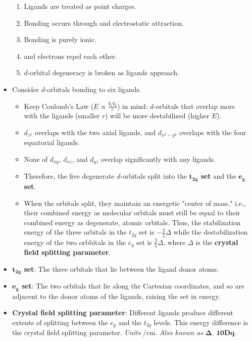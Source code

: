 \documentclass[../notes.tex]{subfiles}
\begin{document}
\begin{itemize}
\begin{enumerate}
        \item Ligands are treated as point charges.
        \item Bonding occurs through  and  electrostatic attraction.
        \item Bonding is purely ionic.
        \item {} and  electrons repel each other.
        \item $d$-orbital degeneracy is broken as ligands approach.
    \end{enumerate}
    \item Consider $d$-orbitals bonding to six ligands.
    \begin{itemize}
        \item Keep Coulomb's Law ($E\propto\frac{q_1q_2}{r}$) in mind: $d$-orbitals that overlap more with the ligands (smaller $r$) will be more destabilized (higher $E$).
        \item $d_{z^2}$ overlaps with the two axial ligands, and $d_{x^2-y^2}$ overlaps with the four equatorial ligands.
        \item None of $d_{xy}$, $d_{xz}$, and $d_{yz}$ overlap significantly with any ligands.
        \item Therefore, the five degenerate $d$-orbitals split into the \textbf{$\bm{t_{2g}}$ set} and the \textbf{$\bm{e_g}$ set}.
        \item When the orbitals split, they maintain an energetic "center of mass," i.e., their combined energy as molecular orbitals must still be equal to their combined energy as degenerate, atomic orbitals. Thus, the stabilization energy of the three orbitals in the $t_{2g}$ set is $-\frac{2}{5}\Delta$ while the destabilization energy of the two orbbitals in the $e_g$ set is $\frac{3}{5}\Delta$, where $\Delta$ is the \textbf{crystal field splitting parameter}.
    \end{itemize}
    \item \textbf{$\bm{t_{2g}}$ set}: The three orbitals that lie between the ligand donor atoms.
    \item \textbf{$\bm{e_g}$ set}: The two orbitals that lie along the Cartesian coordinates, and so are adjacent to the donor atoms of the ligands, raising the set in energy.
    \item \textbf{Crystal field splitting parameter}: Different ligands produce different extents of splitting between the $e_g$ and the $t_{2g}$ levels. This energy difference is the crystal field splitting parameter. \emph{Units} $\si{\per\centi\meter}$. \emph{Also known as} $\bm{\Delta}$, $\bm{10Dq}$.

\end{itemize}
\end{document}
